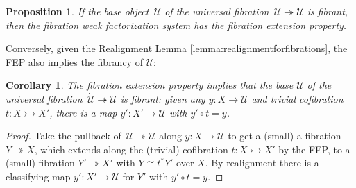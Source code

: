 \documentclass[12pt]{article}
\newcommand{\CC}{\ensuremath{\mathcal{C}}}
\newcommand{\Set}{\ensuremath{\mathsf{Set}}}
\newcommand{\mono}{\ensuremath{\rightarrowtail}}
\newcommand{\ra}{\ensuremath{\rightarrow}}
\newcommand{\cof}{\ensuremath{\rightarrowtail}}
\newcommand{\fib}{\ensuremath{\twoheadrightarrow}}
\newcommand{\onto}{\ensuremath{\twoheadrightarrow}}
\newcommand{\I}{\ensuremath{\mathrm{I}}}
\newcommand{\U}{\ensuremath{\mathcal{U}}}
\newcommand{\UU}{\ensuremath{\,\dot{\mathcal{U}}}}
\newtheorem{proposition}[theorem]{Proposition}
\newtheorem{corollary}[theorem]{Corollary}
\theoremstyle{remark}
\theoremstyle{definition}
\begin{document}
\begin{proposition}\label{prop:UfibtoFEP}
If the base object $\,\U$ of the universal fibration $\UU\fib\U$ is fibrant, then the fibration weak factorization system has the fibration extension property.
\end{proposition}

Conversely, given the Realignment Lemma \ref{lemma:realignmentforfibrations}, the FEP also implies the fibrancy of $\U$:

\begin{corollary}
The fibration extension property implies that the base $\U$ of the universal fibration $\UU\fib\U$ is fibrant: given any $y : X \ra \U$ and trivial cofibration $t : X\cof X'$, there is a map $y' : X' \ra \U$  with $y'\circ t = y$.
\end{corollary}

\begin{proof}
Take the pullback of $\UU\fib\U$ along $y : X \ra \U$ to get a (small) a fibration $Y\fib X$, which extends along the (trivial) cofibration $t : X\cof X'$ by the FEP,  to a (small) fibration $Y'\onto X'$ with $Y \cong t^*Y'$ over $X$.  By realignment there is a classifying map $y' : X' \ra \U$ for $Y'$ with $y'\circ t = y$.
%
%
\end{proof}
\end{document}
